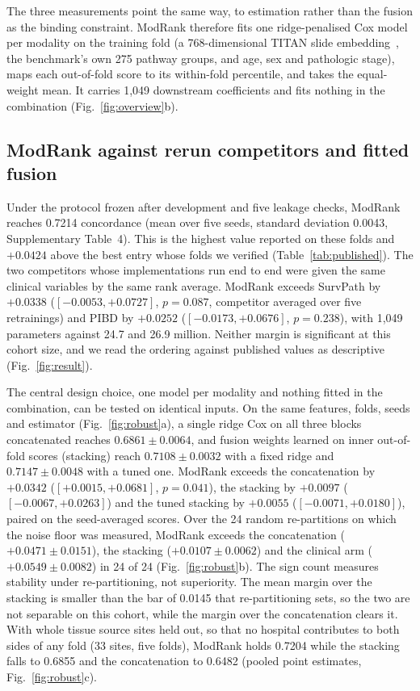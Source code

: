 \documentclass[pdflatex,sn-nature]{sn-jnl}
\begin{document}
The three measurements point the same way, to estimation rather than the fusion as the binding
constraint.
ModRank therefore fits one ridge-penalised Cox model per modality on the training fold (a 768-dimensional
TITAN slide embedding~\citep{ding2025titan}, the benchmark's own 275 pathway groups, and age, sex
and pathologic stage), maps each out-of-fold score to its within-fold percentile, and takes the
equal-weight mean. It carries 1,049 downstream coefficients and fits nothing in the combination
(Fig.~\ref{fig:overview}b).

\subsection*{ModRank against rerun competitors and fitted fusion}

Under the protocol frozen after development and five leakage checks, ModRank reaches
0.7214 concordance (mean over five seeds, standard deviation 0.0043, Supplementary Table~4). This is
the highest value reported on
these folds and $+0.0424$ above the best entry whose folds we verified (Table~\ref{tab:published}).
The two competitors whose implementations run end to end were given the same clinical variables by
the same rank average. ModRank exceeds SurvPath by $+0.0338$ ($[-0.0053, +0.0727]$, $p=0.087$,
competitor averaged over five retrainings) and PIBD by $+0.0252$ ($[-0.0173, +0.0676]$, $p=0.238$),
with 1,049 parameters against 24.7 and 26.9 million. Neither margin is significant at this cohort
size, and we read the ordering against published values as descriptive (Fig.~\ref{fig:result}).

The central design choice, one model per modality and nothing fitted in the combination, can be
tested on identical inputs. On the same features, folds, seeds and
estimator (Fig.~\ref{fig:robust}a), a single ridge Cox on all three blocks concatenated reaches $0.6861 \pm 0.0064$, and
fusion weights learned on inner out-of-fold scores (stacking) reach $0.7108 \pm 0.0032$ with a
fixed ridge and $0.7147 \pm 0.0048$ with a tuned one. ModRank
exceeds the concatenation by $+0.0342$ ($[+0.0015, +0.0681]$, $p=0.041$), the stacking by
$+0.0097$ ($[-0.0067, +0.0263]$) and the tuned stacking by $+0.0055$ ($[-0.0071, +0.0180]$), paired
on the seed-averaged scores. Over the 24 random re-partitions on which the noise floor was
measured, ModRank exceeds the concatenation ($+0.0471 \pm 0.0151$), the stacking ($+0.0107 \pm 0.0062$)
and the clinical arm ($+0.0549 \pm 0.0082$) in 24 of 24 (Fig.~\ref{fig:robust}b). The sign count
measures stability under re-partitioning, not superiority. The mean margin over the stacking is
smaller than the bar of 0.0145 that re-partitioning sets, so the two are not separable on this cohort, while
the margin over the concatenation clears it. With whole tissue
source sites held out, so that no hospital contributes to both sides of any fold (33 sites, five
folds), ModRank holds 0.7204 while the stacking falls to 0.6855 and the concatenation to 0.6482
(pooled point estimates, Fig.~\ref{fig:robust}c).
\end{document}
